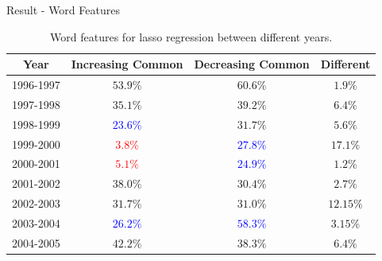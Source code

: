 \documentclass{beamer}
\begin{document}
\begin{frame}{Result - Word Features}

  \begin{table}[H]
    \centering
    \begin{tabular}{|c|c|c|c|}
      \hline
      Year      & Increasing Common          & Decreasing Common          & Different \\
      \hline
      1996-1997 & $53.9\%$                   & $60.6\%$                   & $1.9\%$   \\
      \hline
      1997-1998 & $35.1\%$                   & $39.2\%$                   & $6.4\%$   \\
      \hline
      1998-1999 & \textcolor{blue}{$23.6\%$} & $31.7\%$                   & $5.6\%$   \\
      \hline
      1999-2000 & \textcolor{red}{$3.8\%$}   & \textcolor{blue}{$27.8\%$} & $17.1\%$  \\
      \hline
      2000-2001 & \textcolor{red}{$5.1\%$}   & \textcolor{blue}{$24.9\%$} & $1.2\%$   \\
      \hline
      2001-2002 & $38.0\%$                   & $30.4\%$                   & $2.7\%$   \\
      \hline
      2002-2003 & $31.7\%$                   & $31.0\%$                   & $12.15\%$ \\
      \hline
      2003-2004 & \textcolor{blue}{$26.2\%$} & \textcolor{blue}{$58.3\%$} & $3.15\%$  \\
      \hline
      2004-2005 & $42.2\%$                   & $38.3\%$                   & $6.4\%$   \\
      \hline
    \end{tabular}
    \caption{Word features for lasso regression between different years.}
  \end{table}

\end{frame}
\end{document}
